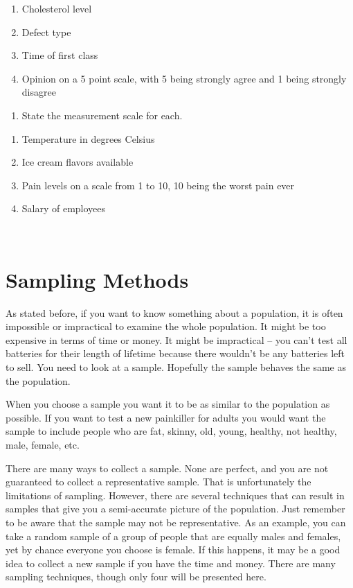 \documentclass[
]{book}
\providecommand{\tightlist}{%
  \setlength{\itemsep}{0pt}\setlength{\parskip}{0pt}}
\begin{document}
\begin{enumerate}
\def\labelenumi{\alph{enumi}.}
\tightlist
\item
  Cholesterol level
\item
  Defect type
\item
  Time of first class
\item
  Opinion on a 5 point scale, with 5 being strongly agree and 1 being strongly disagree
\end{enumerate}

\begin{enumerate}
\def\labelenumi{\arabic{enumi}.}
\setcounter{enumi}{9}
\tightlist
\item
  State the measurement scale for each.
\end{enumerate}

\begin{enumerate}
\def\labelenumi{\alph{enumi}.}
\tightlist
\item
  Temperature in degrees Celsius
\item
  Ice cream flavors available
\item
  Pain levels on a scale from 1 to 10, 10 being the worst pain ever
\item
  Salary of employees
\end{enumerate}

\textbf{\\
}

\hypertarget{sampling-methods}{%
\section{Sampling Methods}\label{sampling-methods}}

As stated before, if you want to know something about a population, it is often impossible or impractical to examine the whole population. It might be too expensive in terms of time or money. It might be impractical -- you can't test all batteries for their length of lifetime because there wouldn't be any batteries left to sell. You need to look at a sample. Hopefully the sample behaves the same as the population.

When you choose a sample you want it to be as similar to the population as possible. If you want to test a new painkiller for adults you would want the sample to include people who are fat, skinny, old, young, healthy, not healthy, male, female, etc.

There are many ways to collect a sample. None are perfect, and you are not guaranteed to collect a representative sample. That is unfortunately the limitations of sampling. However, there are several techniques that can result in samples that give you a semi-accurate picture of the population. Just remember to be aware that the sample may not be representative. As an example, you can take a random sample of a group of people that are equally males and females, yet by chance everyone you choose is female. If this happens, it may be a good idea to collect a new sample if you have the time and money.
There are many sampling techniques, though only four will be presented here.
\end{document}
